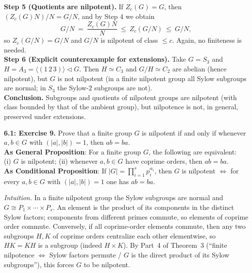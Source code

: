 \documentclass[12pt]{article}
\theoremstyle{definition}
\begin{document}
\textbf{Step 5 (Quotients are nilpotent).} If $Z_c(G)=G$, then $(Z_c(G)N)/N=G/N$, and by Step 4 we obtain
\[
G/N\ =\ \frac{Z_c(G)N}{N}\ \le\ Z_c(G/N)\ \le\ G/N,
\]
so $Z_c(G/N)=G/N$ and $G/N$ is nilpotent of class $\le c$. Again, no finiteness is needed.\\

\textbf{Step 6 (Explicit counterexample for extensions).} Take $G=S_3$ and $H=A_3=\langle(1\,2\,3)\rangle\lhd G$. Then $H\simeq C_3$ and $G/H\simeq C_2$ are abelian (hence nilpotent), but $G$ is not nilpotent (in a finite nilpotent group all Sylow subgroups are normal; in $S_3$ the Sylow-$2$ subgroups are not).\\

\medskip
\textbf{Conclusion.} Subgroups and quotients of nilpotent groups are nilpotent (with class bounded by that of the ambient group), but nilpotence is not, in general, preserved under extensions.

\newpage

\newpage

\noindent \textbf{6.1: Exercise 9.} Prove that a finite group $G$ is nilpotent if and only if whenever $a,b\in G$ with $(|a|,|b|)=1$, then $ab=ba$. \\ %

\noindent\textbf{As General Proposition}: For a finite group $G$, the following are equivalent: \\
(i) $G$ is nilpotent; \quad
(ii) whenever $a,b\in G$ have coprime orders, then $ab=ba$.\\

\noindent\textbf{As Conditional Proposition}: If $|G|=\prod_{i=1}^{s}p_i^{\alpha_i}$, then $G$ is nilpotent $\iff$ for every $a,b\in G$ with $(|a|,|b|)=1$ one has $ab=ba$.\\

\newpage

\dotfill

\emph{Intuition.}
In a finite nilpotent group the Sylow subgroups are normal and $G\cong P_1\times\cdots\times P_s$. An element is the product of its components in the distinct Sylow factors; components from different primes commute, so elements of coprime order commute. Conversely, if all coprime-order elements commute, then any two subgroups $H,K$ of coprime orders centralize each other elementwise, so $HK=KH$ is a subgroup (indeed $H\times K$). By Part~4 of Theorem~3 (``finite nilpotence $\iff$ Sylow factors permute / $G$ is the direct product of its Sylow subgroups''), this forces $G$ to be nilpotent.\\
\end{document}
